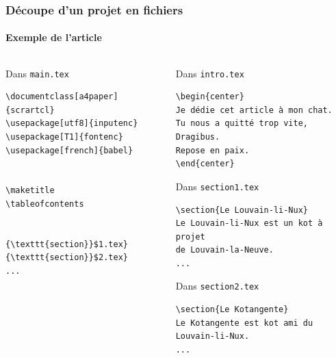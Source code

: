\begin{frame}[fragile]
  \frametitle{\Warning Découpe d'un projet en fichiers}
  \framesubtitle{Exemple de l'article}
  \begin{columns}
      \begin{column}{0.5\textwidth}
          Dans \texttt{main.tex}
          \begin{lstlisting}[style=nonumbers, mathescape]
\documentclass[a4paper]{scrartcl}
\usepackage[utf8]{inputenc}
\usepackage[T1]{fontenc}
\usepackage[french]{babel}


\maketitle
\tableofcontents


{\texttt{section}}$1.tex}
{\texttt{section}}$2.tex}
...

          \end{lstlisting}
      \end{column}
      \begin{column}{0.5\textwidth}
          Dans \texttt{intro.tex}
          \begin{lstlisting}[style=nonumbers]
\begin{center}
Je dédie cet article à mon chat.
Tu nous a quitté trop vite, Dragibus.
Repose en paix.
\end{center}
          \end{lstlisting}

          Dans \texttt{section1.tex}
          \begin{lstlisting}[style=nonumbers]
\section{Le Louvain-li-Nux}
Le Louvain-li-Nux est un kot à projet
de Louvain-la-Neuve.
...
          \end{lstlisting}

          Dans \texttt{section2.tex}
          \begin{lstlisting}[style=nonumbers]
\section{Le Kotangente}
Le Kotangente est kot ami du
Louvain-li-Nux.
...
          \end{lstlisting}
      \end{column}
  \end{columns}
\end{frame}

